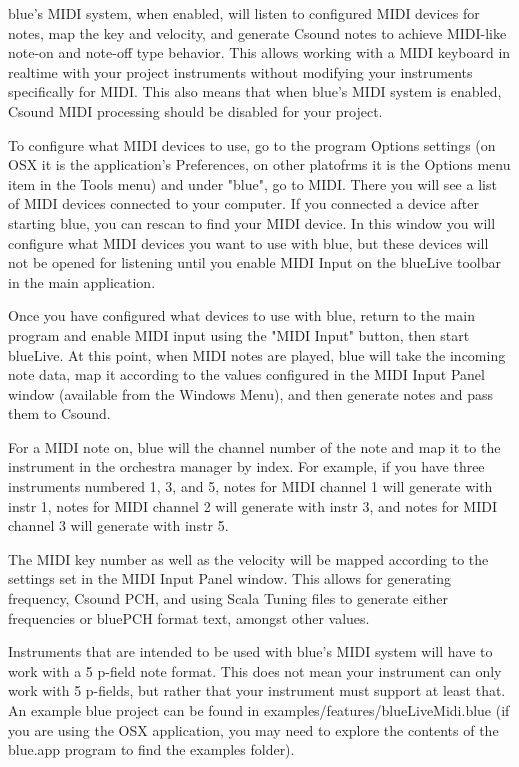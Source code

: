 blue's MIDI system, when enabled, will listen to configured MIDI devices
for notes, map the key and velocity, and generate Csound notes to
achieve MIDI-like note-on and note-off type behavior. This allows
working with a MIDI keyboard in realtime with your project instruments
without modifying your instruments specifically for MIDI. This also
means that when blue's MIDI system is enabled, Csound MIDI processing
should be disabled for your project.

To configure what MIDI devices to use, go to the program Options
settings (on OSX it is the application's Preferences, on other platofrms
it is the Options menu item in the Tools menu) and under "blue", go to
MIDI. There you will see a list of MIDI devices connected to your
computer. If you connected a device after starting blue, you can rescan
to find your MIDI device. In this window you will configure what MIDI
devices you want to use with blue, but these devices will not be opened
for listening until you enable MIDI Input on the blueLive toolbar in the
main application.

Once you have configured what devices to use with blue, return to the
main program and enable MIDI input using the "MIDI Input" button, then
start blueLive. At this point, when MIDI notes are played, blue will
take the incoming note data, map it according to the values configured
in the MIDI Input Panel window (available from the Windows Menu), and
then generate notes and pass them to Csound.

For a MIDI note on, blue will the channel number of the note and map it
to the instrument in the orchestra manager by index. For example, if you
have three instruments numbered 1, 3, and 5, notes for MIDI channel 1
will generate with instr 1, notes for MIDI channel 2 will generate with
instr 3, and notes for MIDI channel 3 will generate with instr 5.

The MIDI key number as well as the velocity will be mapped according to
the settings set in the MIDI Input Panel window. This allows for
generating frequency, Csound PCH, and using Scala Tuning files to
generate either frequencies or bluePCH format text, amongst other
values.

Instruments that are intended to be used with blue's MIDI system will
have to work with a 5 p-field note format. This does not mean your
instrument can only work with 5 p-fields, but rather that your
instrument must support at least that. An example blue project can be
found in examples/features/blueLiveMidi.blue (if you are using the OSX
application, you may need to explore the contents of the blue.app
program to find the examples folder).

